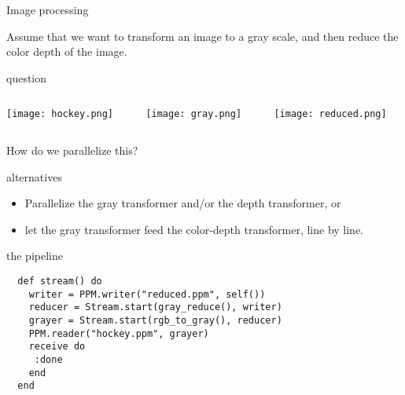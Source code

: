 \begin{frame}{Image processing}

Assume that we want to transform an image to a gray scale, and then
reduce the color depth of the image.
\end{frame}


\begin{frame}{question}

  \begin{columns}
    \begin{column}{0.33\linewidth}
      \texttt{[image: hockey.png]}
    \end{column}
    \pause
    \begin{column}{0.33\linewidth}
      \texttt{[image: gray.png]}
    \end{column}
    \pause
    \begin{column}{0.33\linewidth}
      \texttt{[image: reduced.png]}
    \end{column}
\end{columns}

\pause\vspace{20pt}How do we parallelize this?

\end{frame}

\begin{frame}{alternatives}

\begin{itemize}
\pause \item Parallelize the gray transformer and/or the depth transformer, or
\pause \item let the gray transformer feed the color-depth transformer, line by line.
\end{itemize}

\pause\vspace{10pt}{\em A pipe-line: reader - transform - transform - writer}

\end{frame}

\begin{frame}[fragile]{the pipeline}

\begin{verbatim}
  def stream() do
    writer = PPM.writer("reduced.ppm", self())
    reducer = Stream.start(gray_reduce(), writer)     
    grayer = Stream.start(rgb_to_gray(), reducer)     
    PPM.reader("hockey.ppm", grayer)
    receive do
     :done
    end
  end
\end{verbatim}

\end{frame}

